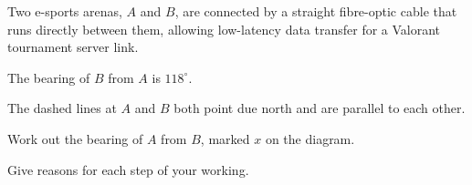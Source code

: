 \begin{question}
\noindent Two e-sports arenas, $A$ and $B$, are connected by a straight fibre-optic cable that runs directly between them, allowing low-latency data transfer for a Valorant tournament server link.

\noindent The bearing of $B$ from $A$ is $118^\circ$.

\begin{center}
\end{center}

\noindent The dashed lines at $A$ and $B$ both point due north and are parallel to each other.

\noindent Work out the bearing of $A$ from $B$, marked $x$ on the diagram.

\noindent Give reasons for each step of your working.

\vspace{5cm}

\begin{flushright}
\end{flushright}
\end{question}